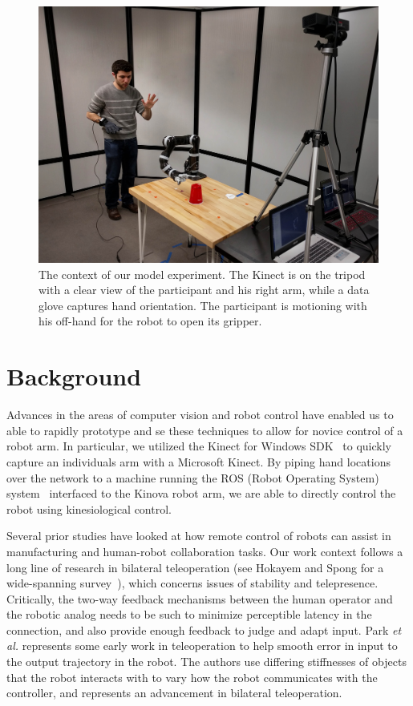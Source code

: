 \documentclass{sigchi}
\begin{document}
\begin{figure}[t]
	\centering
	\includegraphics[width=\columnwidth]{../Data/Figures/kinesiological_demo_2.jpg}
	\caption{The context of our model experiment.  The Kinect is on the tripod with a clear view of the participant and his right arm, while a data glove captures hand orientation.  The participant is motioning with his off-hand for the robot to open its gripper.}
	 \label{fig:demo}
\end{figure} 

\section{Background}

Advances in the areas of computer vision and robot control have enabled us to able to rapidly prototype and se these techniques to allow for novice control of a robot arm.  In particular, we utilized the Kinect for Windows SDK~\cite{Kinect} to quickly capture an individuals arm with a Microsoft Kinect.  By piping hand locations over the network to a machine running the ROS (Robot Operating System) system~\cite{ROS} interfaced to the Kinova robot arm, we are able to directly control the robot using kinesiological control.

Several prior studies have looked at how remote control of robots can assist in manufacturing and human-robot collaboration tasks. Our work context follows a long line of research in bilateral teleoperation (see Hokayem and Spong for a wide-spanning survey~\cite{hokayem2006bilateral}), which concerns issues of stability and telepresence.  Critically, the two-way feedback mechanisms between the human operator and the robotic analog needs to be such to minimize perceptible latency in the connection, and also provide enough feedback to judge and adapt input.  Park \emph{et al.} represents some early work in teleoperation to help smooth error in input to the output trajectory in the robot.  The authors use differing stiffnesses of objects that the robot interacts with to vary how the robot communicates with the controller, and represents an advancement in bilateral teleoperation.
\end{document}
